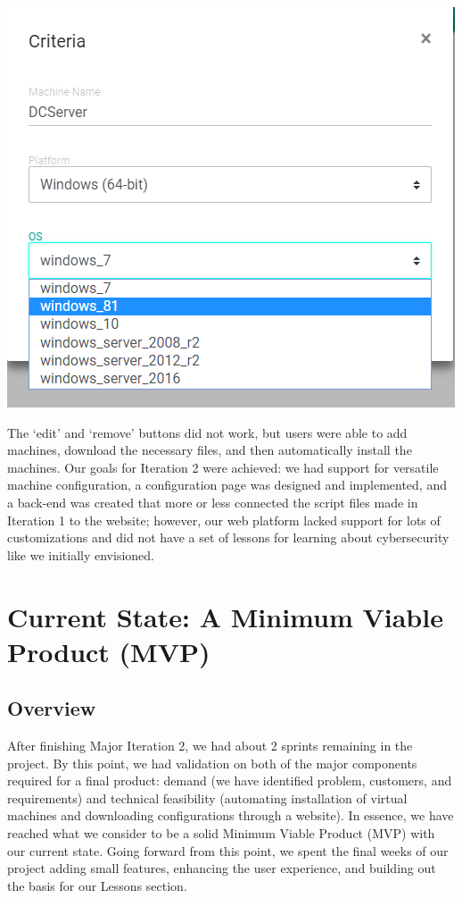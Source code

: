 \documentclass[openright]{report}
\begin{document}
\begin{center}
    \includegraphics[scale=0.64]{images/modal.png}
    \label{modal}
\end{center}

\par The `edit' and `remove' buttons did not work, but users were able to add machines, download the necessary files, and then automatically install the machines. Our goals for Iteration 2 were achieved: we had support for versatile machine configuration, a configuration page was designed and implemented, and a back-end was created that more or less connected the script files made in Iteration 1 to the website; however, our web platform lacked support for lots of customizations and did not have a set of lessons for learning about cybersecurity like we initially envisioned.

\chapter{Current State: A Minimum Viable Product (MVP)}

\section{Overview}
After finishing Major Iteration 2, we had about 2 sprints remaining in the project. By this point, we had validation on both of the major components required for a final product: demand (we have identified problem, customers, and requirements) and technical feasibility (automating installation of virtual machines and downloading configurations through a website). In essence, we have reached what we consider to be a solid Minimum Viable Product (MVP) with our current state. Going forward from this point, we spent the final weeks of our project adding small features, enhancing the user experience, and building out the basis for our Lessons section.
\end{document}
